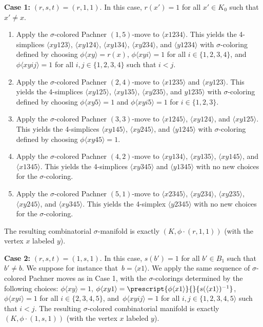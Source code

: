 \documentclass[a4paper, oneside]{amsart}
\numberwithin{equation}{subsection}
\theoremstyle{referencedlemma}
\theoremstyle{plain} %
\theoremstyle{remark}
\begin{document}
\textbf{Case 1:} $(r,s,t) = (r,1,1)$. In this case, $r(x') = 1$ for all $x'\in K_0$ such that $x'\neq x$.  
\begin{enumerate}
\item Apply the $\sigma$-colored Pachner $(1,5)$-move to $\langle x1234\rangle$. This yields the 4-simplices $\langle xy123\rangle$, $\langle xy124\rangle$, $\langle xy134\rangle$, $\langle xy234\rangle$, and $\langle y1234\rangle$ with $\sigma$-coloring defined by choosing $\phi\langle xy\rangle = r(x)$, $\phi\langle xyi\rangle =1$ for all $i\in\{1,2,3,4\}$, and $\phi\langle xyij\rangle =1$ for all $i,j \in \{1,2,3,4\}$ such that $i<j$.
\item Apply the $\sigma$-colored Pachner $(2,4)$-move to $\langle x1235\rangle$ and $\langle xy123\rangle$. This yields the 4-simplices $\langle xy125\rangle$, $\langle xy135\rangle$, $\langle xy235\rangle$, and $y1235\rangle$ with $\sigma$-coloring defined by choosing $\phi\langle xy5\rangle =1$ and $\phi\langle xyi5\rangle = 1$ for $i\in\{1,2,3\}$.
\item Apply the $\sigma$-colored Pachner $(3,3)$-move to $\langle x1245\rangle$, $\langle xy124\rangle$, and $\langle xy125\rangle$. This yields the 4-simplices $\langle xy145\rangle$, $\langle xy245\rangle$, and $\langle y1245\rangle$ with $\sigma$-coloring defined by choosing $\phi\langle xy45\rangle = 1$.
\item Apply the $\sigma$-colored Pachner $(4,2)$-move to $\langle xy134\rangle$, $\langle xy135\rangle$, $\langle xy145\rangle$, and $\langle x1345\rangle$. This yields the 4-simplices $\langle xy345\rangle$ and $\langle y1345\rangle$ with no new choices for the $\sigma$-coloring.
\item Apply the $\sigma$-colored Pachner $(5,1)$-move to $\langle x2345\rangle$, $\langle xy234\rangle$, $\langle xy235\rangle$, $\langle xy245\rangle$, and $\langle xy345\rangle$. This yields the 4-simplex $\langle y2345\rangle$ with no new choices for the $\sigma$-coloring.
\end{enumerate}
The resulting combinatorial $\sigma$-manifold is exactly $(K, \phi\cdot (r,1,1))$ (with the vertex $x$ labeled $y$).

\textbf{Case 2:} $(r,s,t) = (1,s,1)$. In this case, $s(b') = 1$ for all $b' \in B_1$ such that $b'\neq b$. We suppose for instance that~$b =\langle x1\rangle$. We apply the same sequence of $\sigma$-colored Pachner moves as in Case 1, with the $\sigma$-colorings determined by the following choices: $\phi\langle xy\rangle =1$, $\phi\langle xy1\rangle = \prescript{\phi\langle x1\rangle}{}{s(\langle x1\rangle)^{-1}}$, $\phi\langle xyi\rangle = 1$ for all $i\in \{2,3,4,5\}$, and~$\phi\langle xyij\rangle = 1$ for all $i,j\in \{1,2,3,4,5\rangle$ such that $i<j$. The resulting $\sigma$-colored combinatorial manifold is exactly $(K, \phi\cdot (1,s,1))$ (with the vertex $x$ labeled $y$).
\end{document}
